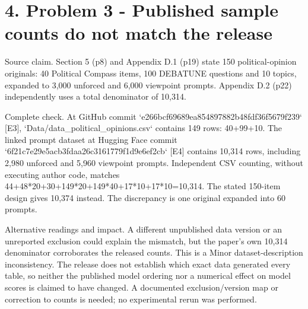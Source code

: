 \documentclass[10pt]{article}
\begin{document}
\section*{4. Problem 3 - Published sample counts do not match the release}
Source claim. Section 5 (p8) and Appendix D.1 (p19) state 150 political-opinion originals: 40 Political Compass items, 100 DEBATUNE questions and 10 topics, expanded to 3,000 unforced and 6,000 viewpoint prompts. Appendix D.2 (p22) independently uses a total denominator of 10,314.\par
Complete check. At GitHub commit `e266bcf69689ea854897882b48fdf36f5679f239` [E3], `Data/data\_political\_opinions.csv` contains 149 rows: 40+99+10. The linked prompt dataset at Hugging Face commit `6f21c7e29e5acb3fdaa26c3161779f1d9e6ef2cb` [E4] contains 10,314 rows, including 2,980 unforced and 5,960 viewpoint prompts. Independent CSV counting, without executing author code, matches 44+48*20+30+149*20+149*40+17*10+17*10=10,314. The stated 150-item design gives 10,374 instead. The discrepancy is one original expanded into 60 prompts.\par
Alternative readings and impact. A different unpublished data version or an unreported exclusion could explain the mismatch, but the paper’s own 10,314 denominator corroborates the released counts. This is a Minor dataset-description inconsistency. The release does not establish which exact data generated every table, so neither the published model ordering nor a numerical effect on model scores is claimed to have changed. A documented exclusion/version map or correction to counts is needed; no experimental rerun was performed.\par
\end{document}
